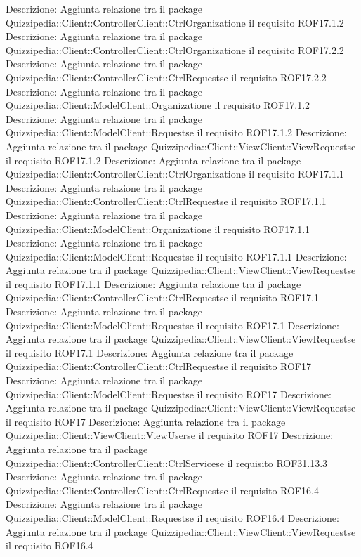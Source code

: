 Descrizione: Aggiunta relazione tra il package Quizzipedia::Client::ControllerClient::CtrlOrganizatione il requisito ROF17.1.2 
Descrizione: Aggiunta relazione tra il package Quizzipedia::Client::ControllerClient::CtrlOrganizatione il requisito ROF17.2.2 
Descrizione: Aggiunta relazione tra il package Quizzipedia::Client::ControllerClient::CtrlRequestse il requisito ROF17.2.2 
Descrizione: Aggiunta relazione tra il package Quizzipedia::Client::ModelClient::Organizatione il requisito ROF17.1.2 
Descrizione: Aggiunta relazione tra il package Quizzipedia::Client::ModelClient::Requestse il requisito ROF17.1.2 
Descrizione: Aggiunta relazione tra il package Quizzipedia::Client::ViewClient::ViewRequestse il requisito ROF17.1.2 
Descrizione: Aggiunta relazione tra il package Quizzipedia::Client::ControllerClient::CtrlOrganizatione il requisito ROF17.1.1 
Descrizione: Aggiunta relazione tra il package Quizzipedia::Client::ControllerClient::CtrlRequestse il requisito ROF17.1.1 
Descrizione: Aggiunta relazione tra il package Quizzipedia::Client::ModelClient::Organizatione il requisito ROF17.1.1 
Descrizione: Aggiunta relazione tra il package Quizzipedia::Client::ModelClient::Requestse il requisito ROF17.1.1 
Descrizione: Aggiunta relazione tra il package Quizzipedia::Client::ViewClient::ViewRequestse il requisito ROF17.1.1 
Descrizione: Aggiunta relazione tra il package Quizzipedia::Client::ControllerClient::CtrlRequestse il requisito ROF17.1 
Descrizione: Aggiunta relazione tra il package Quizzipedia::Client::ModelClient::Requestse il requisito ROF17.1 
Descrizione: Aggiunta relazione tra il package Quizzipedia::Client::ViewClient::ViewRequestse il requisito ROF17.1 
Descrizione: Aggiunta relazione tra il package Quizzipedia::Client::ControllerClient::CtrlRequestse il requisito ROF17 
Descrizione: Aggiunta relazione tra il package Quizzipedia::Client::ModelClient::Requestse il requisito ROF17 
Descrizione: Aggiunta relazione tra il package Quizzipedia::Client::ViewClient::ViewRequestse il requisito ROF17 
Descrizione: Aggiunta relazione tra il package Quizzipedia::Client::ViewClient::ViewUserse il requisito ROF17 
Descrizione: Aggiunta relazione tra il package Quizzipedia::Client::ControllerClient::CtrlServicese il requisito ROF31.13.3 
Descrizione: Aggiunta relazione tra il package Quizzipedia::Client::ControllerClient::CtrlRequestse il requisito ROF16.4 
Descrizione: Aggiunta relazione tra il package Quizzipedia::Client::ModelClient::Requestse il requisito ROF16.4 
Descrizione: Aggiunta relazione tra il package Quizzipedia::Client::ViewClient::ViewRequestse il requisito ROF16.4 
